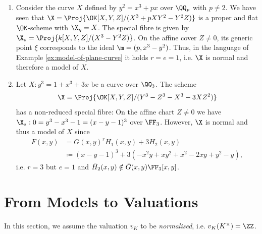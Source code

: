 \begin{example}\label{ex:particular-model-of-plane-curve}
    \begin{enumerate}
        \item Consider the curve $X$ defined by $y^2 = x^3 + px$ over $\QQ_p$ with $p \neq 2$.
            We have seen that $\X = \Proj{\OK[X,Y,Z]/(X^3 + pXY^2 - Y^2Z)}$ is a proper and flat $\OK$-scheme with $\X_\eta = X$.
            The special fibre is given by $\X_s = \Proj{k[X,Y,Z]/(X^3 - Y^2Z)}$.
            On the affine cover $Z\neq 0$, its generic point $\xi$ corresponds to the ideal $\m = (p, x^3-y^2)$.
            Thus, in the language of Example \ref{ex:model-of-plane-curve} it holds $r=e=1$, i.e. $\X$ is normal and therefore a model of $X$.
        \item Let $X: y^3 = 1 + x^3 + 3x$ be a curve over $\QQ_3$.
            The scheme 
            \begin{align}
                \X = \Proj{\OK[X,Y,Z]/(Y^3 - Z^3 - X^3 - 3XZ^2)}
            \end{align}
            has a non-reduced special fibre:
            On the affine chart $Z \neq 0$ we have $\X_s: 0 = y^3 - x^3 - 1 = (x - y - 1)^3$ over $\FF_3$.
            However, $\X$ is normal and thus a model of $X$ since
            \begin{align*}
                F(x,y) &= G(x,y)^r H_1(x,y) + 3 H_2(x,y) \\
                    &\coloneqq (x-y-1)^3 + 3(-x^2y + xy^2 + x^2 - 2xy + y^2 - y),
            \end{align*}
            i.e. $r=3$ but $e=1$ and $\bar{H}_2(x,y) \notin \bar{G}(x,y)\FF_3[x,y]$.
    \end{enumerate}
\end{example}


\section{From Models to Valuations}\label{sec:from-models-to-valuations}
In this section, we assume the valuation $v_K$ to be \textit{normalised}, i.e. $v_K(K^\times) = \ZZ$.

